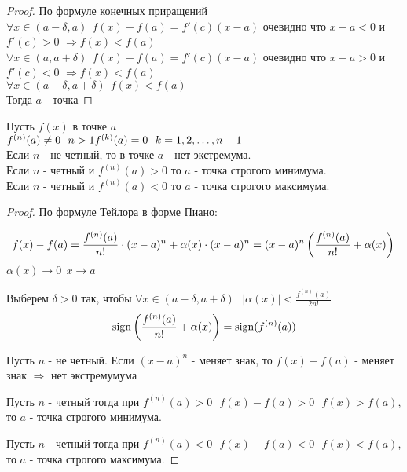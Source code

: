 \begin{proof}
  По формуле конечных приращений\\
  $\forall x \in (a - \delta, a) ~~ f(x) - f(a) = f'(c)(x - a)$ очевидно что
  $x - a < 0$ и \\ $f'(c) > 0$ $\Rightarrow f(x) < f(a)$\\
  $\forall x \in (a, a + \delta) ~~ f(x) - f(a) = f'(c)(x - a)$ очевидно что
  $x - a > 0$ и \\ $f'(c) < 0$ $\Rightarrow f(x) < f(a)$\\
  $\forall x \in (a - \delta, a+ \delta) ~~ f(x) < f(a)$\\
  Тогда $a$ - точка 
\end{proof}

\begin{theorem}
  Пусть $f(x)$ в точке $a$\\
  $f^{(n)} (a) \neq 0 ~~ n > 1\\
  f^{(k)} (a) = 0 ~~ k = 1, 2, \ldots, n-1$\\
  Если $n$ - не четный, то в точке $a$ - нет экстремума.\\
  Если $n$ - четный и $f^{(n)} (a) > 0$ то $a$ - точка строгого минимума.\\
  Если $n$ - четный и $f^{(n)} (a) < 0$ то $a$ - точка строгого максимума.
\end{theorem}

\begin{proof}
  По формуле Тейлора в форме Пиано:

  $$
  f(x) - f(a) = \frac{f^{(n)}(a)}{n!} \cdot (x - a)^n + \alpha (x)
  \cdot (x - a)^n = (x - a)^n \left(\frac{f^{(n)}(a)}{n!} + \alpha(x) \right)\\
  $$
  $\alpha (x) \to 0 ~~ x \to a$

  Выберем $\delta > 0$ так, чтобы $\forall x \in
  (a - \delta, a + \delta) ~~~ |\alpha(x)| < \frac{f^{(n)}(a)}{2n!}$
  $$
  \mathrm{sign} \left(\frac{f^{(n)}(a)}{n!} + \alpha(x)\right) = \mathrm{sign} (f^{(n)}(a))
  $$

  Пусть $n$ - не четный. Если $(x - a)^n$ - меняет знак, то
  $f(x) - f(a)$ - меняет знак $\Rightarrow$ нет экстремумума

  Пусть $n$ - четный тогда при
  $f^{(n)}(a) > 0 ~~~ f(x) - f(a) > 0 ~~~ f(x) > f(a) $,
  то $a$ - точка строгого минимума.

  Пусть $n$ - четный тогда при
  $f^{(n)}(a) < 0 ~~~ f(x) - f(a) < 0 ~~~ f(x) < f(a) $,
  то $a$ - точка строгого максимума.
\end{proof}


